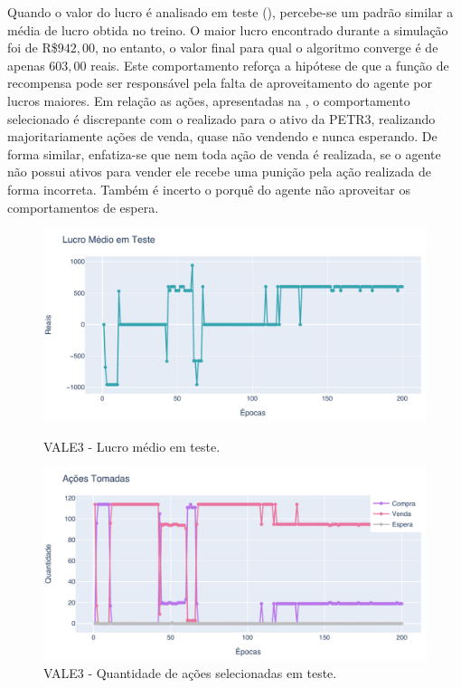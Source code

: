 Quando o valor do lucro é analisado em teste (), percebe-se um padrão similar a média de lucro obtida no treino. O maior lucro encontrado durante a simulação foi de R\$$942,00$, no entanto, o valor final para qual o algoritmo converge é de apenas $603,00$ reais. Este comportamento reforça a hipótese de que a função de recompensa pode ser responsável pela falta de aproveitamento do agente por lucros maiores. Em relação as ações, apresentadas na , o comportamento selecionado é discrepante com o realizado para o ativo da PETR3, realizando majoritariamente ações de venda, quase não vendendo e nunca esperando. De forma similar, enfatiza-se que nem toda ação de venda é realizada, se o agente não possui ativos para vender ele recebe uma punição pela ação realizada de forma incorreta. Também é incerto o porquê do agente não aproveitar os comportamentos de espera.

\begin{figure}[htbp]
    \centering 
    \begin{minipage}[b]{0.45\linewidth}
        \includegraphics[width=\linewidth]{img/ddpg/vale3/clean/profit}
        \caption{VALE3 - Lucro médio em teste.} 
        \label{vale_clean_profit}
    \end{minipage}
    \quad
    \begin{minipage}[b]{0.45\linewidth}
        \includegraphics[width=\linewidth]{img/ddpg/vale3/clean/actions}
        \caption{VALE3 - Quantidade de ações selecionadas em teste.}
        \label{vale_clean_act}
    \end{minipage}
\end{figure}

